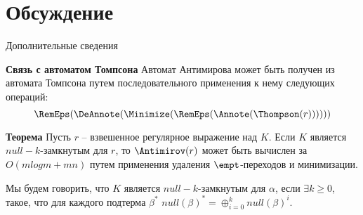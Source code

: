 \section{Обсуждение}
\begin{frame}{Дополнительные сведения}
    \begin{block}{\bf Связь с автоматом Томпсона}
        Автомат Антимирова может быть получен из автомата Томпсона путем последовательного применения к нему следующих операций:
        \[\RemEps(\DeAnnote(\Minimize(\RemEps(\Annote(\Thompson(r))))))\] %
    \end{block}
    \begin{block}{\bf Теорема}
        Пусть $r$ -- взвешенное регулярное выражение над $K$. Если $K$ является $null-k$-замкнутым для $r$, то $\Antimirov(r)$ может быть вычислен за $O(m log m + mn)$ путем применения удаления $\empt$-переходов и минимизации.
    \end{block}
    Мы будем говорить, что $K$ является $null-k$-замкнутым для $\alpha$, если $\exists k \geq 0$, такое, что для каждого подтерма $\beta^*$ $null(\beta)^* = \oplus_{i=0}^{k} null(\beta)^i$.
\end{frame}
